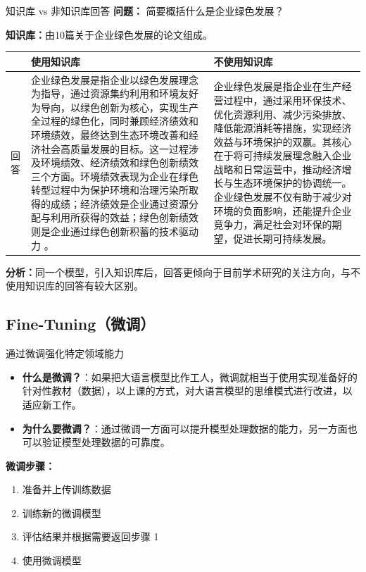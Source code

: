 \documentclass{beamer}
\begin{document}
\begin{frame}[fragile]{知识库 vs 非知识库回答}
\small
\textbf{问题：} 简要概括什么是企业绿色发展？

\textbf{知识库：}由10篇关于企业绿色发展的论文组成。

\begin{table}[h]
\centering
\scriptsize
\begin{tabular}{|p{0.5cm}|p{4.5cm}|p{4.3cm}|}
\hline
\textbf{} & \textbf{使用知识库} & \textbf{不使用知识库} \\
\hline
回答 & 
企业绿色发展是指企业以绿色发展理念为指导，通过资源集约利用和环境友好为导向，以绿色创新为核心，实现生产全过程的绿色化，同时兼顾经济绩效和环境绩效，最终达到生态环境改善和经济社会高质量发展的目标。这一过程涉及环境绩效、经济绩效和绿色创新绩效三个方面。环境绩效表现为企业在绿色转型过程中为保护环境和治理污染所取得的成绩；经济绩效是企业通过资源分配与利用所获得的效益；绿色创新绩效则是企业通过绿色创新积蓄的技术驱动力 。
& 
企业绿色发展是指企业在生产经营过程中，通过采用环保技术、优化资源利用、减少污染排放、降低能源消耗等措施，实现经济效益与环境保护的双赢。其核心在于将可持续发展理念融入企业战略和日常运营中，推动经济增长与生态环境保护的协调统一。企业绿色发展不仅有助于减少对环境的负面影响，还能提升企业竞争力，满足社会对环保的期望，促进长期可持续发展。 \\
\hline
\end{tabular}
\end{table}

\textbf{分析：}同一个模型，引入知识库后，回答更倾向于目前学术研究的关注方向，与不使用知识库的回答有较大区别。

\end{frame}

\subsection{Fine-Tuning（微调）}
\begin{frame}[fragile]{通过微调强化特定领域能力}
\small
\begin{itemize}
	
	\item \textbf{什么是微调？}：如果把大语言模型比作工人，微调就相当于使用实现准备好的针对性教材（数据），以上课的方式，对大语言模型的思维模式进行改进，以适应新工作。
	\item \textbf{为什么要微调？}：通过微调一方面可以提升模型处理数据的能力，另一方面也可以验证模型处理数据的可靠度。
\end{itemize}
\textbf{微调步骤：}
\begin{enumerate}
    \item 准备并上传训练数据
    \item 训练新的微调模型
    \item 评估结果并根据需要返回步骤 1
    \item 使用微调模型
\end{enumerate}
\end{frame}
\end{document}
